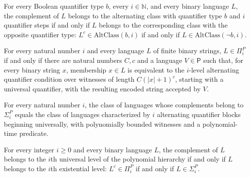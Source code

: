 \begin{theorem}
\label{Complexity.compl_mem_altClass_iff}
\leanok
{}
For every Boolean quantifier type $b$, every $i\in\mathbb{N}$, and every binary language
$L$, the complement of $L$ belongs to the alternating class with quantifier type $b$ and
$i$ quantifier steps if and only if $L$ belongs to the corresponding class with the
opposite quantifier type: $L^{c}\in\mathrm{AltClass}(b,i)$ if and only if
$L\in\mathrm{AltClass}(\neg b,i)$.
\end{theorem}

\begin{theorem}
\label{Complexity.mem_PiP_iff}
\leanok
{}
For every natural number $i$ and every language $L$ of finite binary strings,
$L\in\Pi_i^P$ if and only if there are natural numbers $C,c$ and a language
$V\in\mathsf{P}$ such that, for every binary string $x$, membership $x\in L$ is
equivalent to the $i$-level alternating quantifier condition over witnesses of length
$C(|x|+1)^c$, starting with a universal quantifier, with the resulting encoded string
accepted by $V$.
\end{theorem}

\begin{theorem}
\label{Complexity.PiP_eq_altClass}
\leanok
{}
For every natural number $i$, the class of languages whose complements belong to
$\Sigma_i^P$ equals the class of languages characterized by $i$ alternating quantifier
blocks beginning universally, with polynomially bounded witnesses and a polynomial-time
predicate.
\end{theorem}

\begin{theorem}
\label{Complexity.compl_mem_PiP_iff}
\leanok
{}
For every integer $i\ge 0$ and every binary language $L$, the complement of $L$ belongs
to the $i$th universal level of the polynomial hierarchy if and only if $L$ belongs to
the $i$th existential level: $L^{c}\in\Pi_i^P$ if and only if $L\in\Sigma_i^P$.
\end{theorem}

